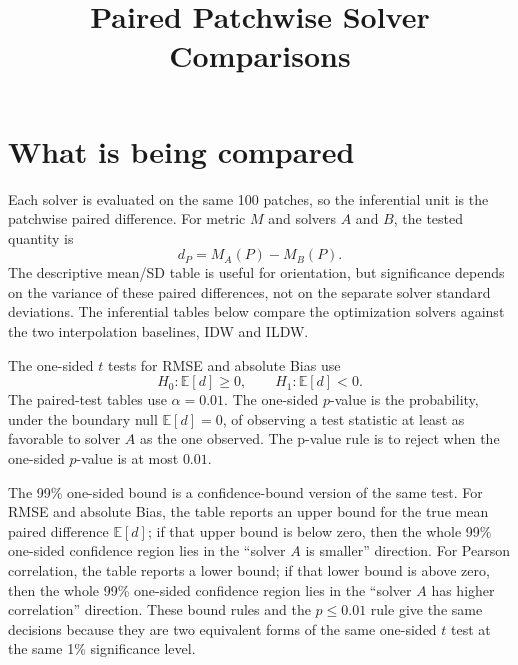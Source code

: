 \documentclass[11pt]{article}
\title{Paired Patchwise Solver Comparisons}
\author{}
\date{}
\begin{document}
\maketitle

\section*{What is being compared}
Each solver is evaluated on the same 100 patches, so the inferential unit is the patchwise paired difference. For metric $M$ and solvers $A$ and $B$, the tested quantity is
\[
d_P = M_A(P) - M_B(P).
\]
The descriptive mean/SD table is useful for orientation, but significance depends on the variance of these paired differences, not on the separate solver standard deviations. The inferential tables below compare the optimization solvers against the two interpolation baselines, IDW and ILDW.

The one-sided $t$ tests for RMSE and absolute Bias use
\[
H_0:\mathbb{E}[d]\ge 0,\qquad H_1:\mathbb{E}[d]<0.
\]
The paired-test tables use $\alpha=0.01$. The one-sided $p$-value is the probability, under the boundary null $\mathbb{E}[d]=0$, of observing a test statistic at least as favorable to solver $A$ as the one observed. The p-value rule is to reject when the one-sided $p$-value is at most $0.01$.

The 99\% one-sided bound is a confidence-bound version of the same test. For RMSE and absolute Bias, the table reports an upper bound for the true mean paired difference $\mathbb{E}[d]$; if that upper bound is below zero, then the whole 99\% one-sided confidence region lies in the ``solver $A$ is smaller'' direction. For Pearson correlation, the table reports a lower bound; if that lower bound is above zero, then the whole 99\% one-sided confidence region lies in the ``solver $A$ has higher correlation'' direction. These bound rules and the $p \le 0.01$ rule give the same decisions because they are two equivalent forms of the same one-sided $t$ test at the same 1\% significance level.
\end{document}
